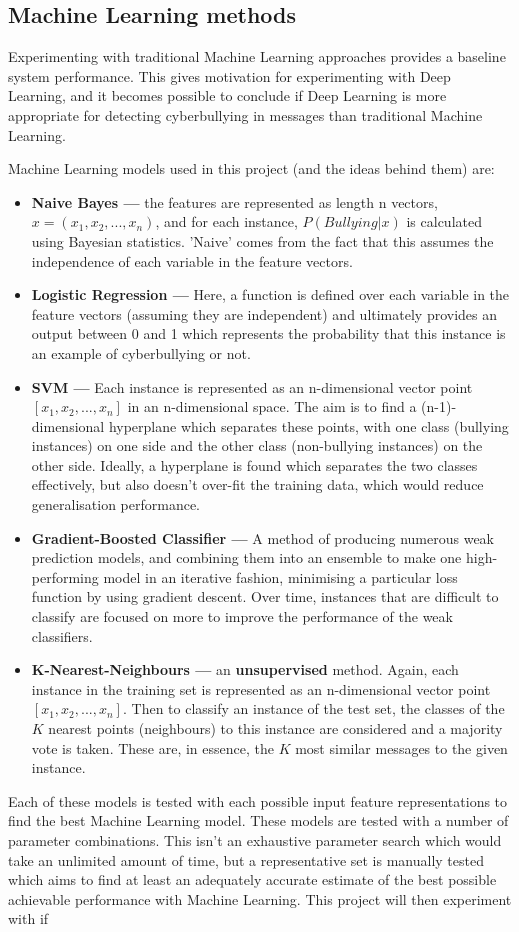 \documentclass[12pt,a4paper]{article}
\begin{document}
\subsection{Machine Learning methods}
Experimenting with traditional Machine Learning approaches provides a baseline system performance. This gives motivation for experimenting with Deep Learning, and it becomes possible to conclude if Deep Learning is more appropriate for detecting cyberbullying in messages than traditional Machine Learning.

Machine Learning models used in this project (and the ideas behind them) are:
\begin{itemize}
	\item \textbf{Naive Bayes ---} the features are represented as length n vectors, $x=(x_1,x_2,...,x_n)$, and for each instance, $P(Bullying | x)$ is calculated using Bayesian statistics. 'Naive' comes from the fact that this assumes the independence of each variable in the feature vectors.
	\item \textbf{Logistic Regression ---} Here, a function is defined over each variable in the feature vectors (assuming they are independent) and ultimately provides an output between 0 and 1 which represents the probability that this instance is an example of cyberbullying or not. 
	\item \textbf{SVM ---} Each instance is represented as an n-dimensional vector point $[x_1,x_2,...,x_n]$ in an n-dimensional space. The aim is to find a (n-1)-dimensional hyperplane which separates these points, with one class (bullying instances) on one side and the other class (non-bullying instances) on the other side. Ideally, a hyperplane is found which separates the two classes effectively, but also doesn't over-fit the training data, which would reduce generalisation performance.
	\item \textbf{Gradient-Boosted Classifier --- } A method of producing numerous weak prediction models, and combining them into an ensemble to make one high-performing model in an iterative fashion, minimising a particular loss function by using gradient descent. Over time, instances that are difficult to classify are focused on more to improve the performance of the weak classifiers.
	\item \textbf{K-Nearest-Neighbours ---} an \textbf{unsupervised} method. Again, each instance in the training set is represented as an n-dimensional vector point $[x_1,x_2,...,x_n]$. Then to classify an instance of the test set, the classes of the $K$ nearest points (neighbours) to this instance are considered and a majority vote is taken. These are, in essence, the $K$ most similar messages to the given instance.
\end{itemize}
Each of these models is tested with each possible input feature representations to find the best Machine Learning model. These models are tested with a number of parameter combinations. This isn't an exhaustive parameter search which would take an unlimited amount of time, but a representative set is manually tested which aims to find at least an adequately accurate estimate of the best possible achievable performance with Machine Learning. This project will then experiment with if 
\end{document}
